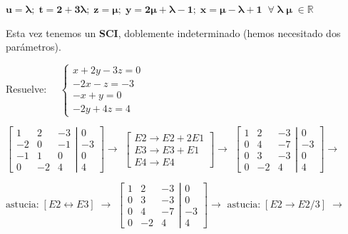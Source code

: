 \begin{proofw}
\noindent \small{$\boldsymbol {u=\lambda; \; t=2+3\lambda;\; z=\mu; \; y=2\mu+\lambda-1; \; x=\mu-\lambda+1\; \; \forall\; \lambda\; \mu \; \in \mathbb R }$}

Esta vez tenemos un \textbf{SCI}, doblemente indeterminado (hemos necesitado dos parámetros).
\end{proofw}


\begin{ejre} 
	Resuelve: $\quad \begin{cases}x+2y-3z=0\\-2x-z=-3\\-x+y=0\\-2y+4z=4\end{cases}$
\end{ejre}
\begin{proofw}\renewcommand{\qedsymbol}{$\diamond$}

$\left[ \begin{matrix}
  1 & 2 & -3 \\ -2 & 0 & -1 \\ -1 & 1 & 0 \\ 0 & -2 & 4  
 \end{matrix}\right. 
 \left| \begin{matrix}
  0 \\ -3 \\ 0 \\ 4
 \end{matrix}\right] \to $ 
 \textcolor{gris}{$\left[ \begin{matrix} E2 \to E2+2E1 \\ E3 \to E3+E1 \\ E4 \to E4\end{matrix} \right] \to $}
 $\left[ \begin{matrix}
  1 & 2 & -3 \\ 0 & 4 & -7 \\ 0 & 3 & -3 \\ 0 & -2 & 4  
 \end{matrix}\right. 
 \left| \begin{matrix}
  0 \\ -3 \\ 0 \\ 4
 \end{matrix}\right] \to $ 
 
 \noindent  \textcolor{gris}{$ \text{astucia:}\;  [E2 \leftrightarrow E3 ] \; \to $}
  $\left[ \begin{matrix}
  1 & 2 & -3 \\ 0 & 3 & -3 \\ 0 & 4 & -7 \\ 0 & -2 & 4  
 \end{matrix}\right. 
 \left| \begin{matrix}
  0 \\ 0 \\ -3 \\ 4
 \end{matrix}\right] \to $ \textcolor{gris}{$  \text{astucia:} \; [E2 \to E2/3]\; \to $}
 

\end{proofw}
